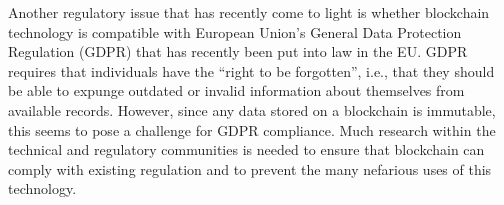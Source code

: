 Another regulatory issue that has recently come to light is whether blockchain technology is compatible with European Union's General Data Protection Regulation (GDPR) that has recently been put into law in the EU.  GDPR requires that individuals have the ``right to be forgotten'', i.e., that they should be able to expunge outdated or invalid information about themselves from available records.  However, since any data stored on a blockchain is immutable, this seems to pose a challenge for GDPR compliance.  Much research within the technical and regulatory communities is needed to ensure that blockchain can comply with existing regulation and to prevent the many nefarious uses of this technology.

